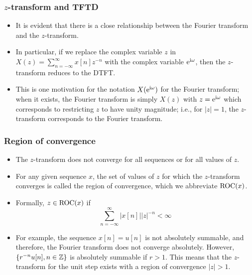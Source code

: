 \begin{frame}
\frametitle{$z$-transform and TFTD}
\begin{itemize}
\item It is evident  that there is a close relationship between the Fourier transform and the $z$-transform.
\item In particular, if we replace the complex variable $z$ in $X(z)= \sum_{n=-\infty}^{\infty} x[n] z^{-n}$ with the complex variable $\mathrm{e}^{\mathrm{i}\omega}$, then the $z$-transform reduces to the DTFT.
\item This is one motivation for the notation $X(\mathrm{e}^{\mathrm{i} \omega})$ for the Fourier transform; when it exists, the Fourier transform is simply $X(z)$ with $z=\mathrm{e}^{\mathrm{i} \omega}$ which  corresponds to restricting $z$ to have unity magnitude; i.e., for $|z| =1$, the $z$-transform corresponds to the Fourier transform.
\end{itemize}
\end{frame}

\begin{frame}
\frametitle{Region of convergence}
\begin{itemize}
\item The $z$-transform does not converge for all sequences or for all values of $z$.
\item For any given sequence $x$, the set of values of $z$ for which the $z$-transform converges is called the \alert{region of convergence}, which we abbreviate \alert{$\mathrm{ROC}(x)$}.
\item Formally, $z \in \mathrm{ROC}(x)$ if
$$
\sum_{n=-\infty}^{\infty}|x[n]| |z|^{-n}<\infty
$$
\item For example, the sequence $x[n]=u[n]$ is not absolutely summable, and therefore, the Fourier transform does not converge absolutely. However, $\{ r^{-n}u[n], n \in \mathbb{Z}\}$ is absolutely summable if $r>1$. This means that the $z$-transform for the unit step exists with a region of convergence $|z|>1$.
\end{itemize}
\end{frame}

